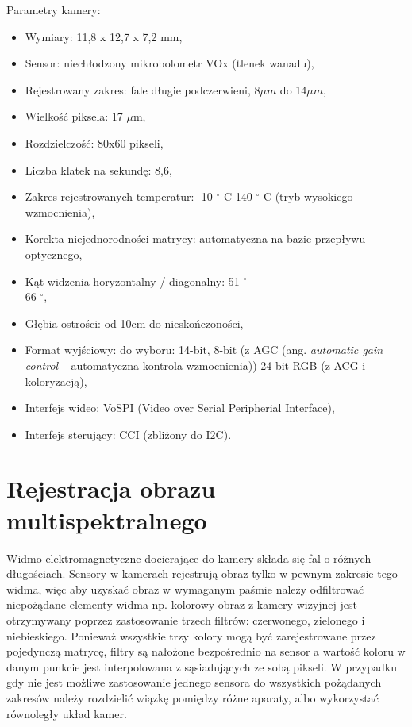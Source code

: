 Parametry kamery:
\begin{itemize}
\item Wymiary: 11,8 x 12,7 x 7,2 mm, 
\item Sensor: niechłodzony mikrobolometr VOx (tlenek wanadu),
\item Rejestrowany zakres: fale długie podczerwieni, 8$\mu m$ do 14$\mu m$,
\item Wielkość piksela: 17 $\mu$m,
\item Rozdzielczość: 80x60 pikseli,
\item Liczba klatek na sekundę: 8,6,  %
\item Zakres rejestrowanych temperatur: -10  $^\circ$  C 140  $^\circ$  C (tryb wysokiego wzmocnienia),
\item Korekta niejednorodności matrycy: automatyczna na bazie przepływu optycznego, %
\item Kąt widzenia horyzontalny / diagonalny: 51 $^\circ$ \\ 66 $^\circ$,
\item Głębia ostrości: od 10cm do nieskończoności,
\item Format wyjściowy: do wyboru: 14-bit, 8-bit (z AGC (ang. \textit{automatic gain control} -- automatyczna kontrola wzmocnienia)) 24-bit RGB (z ACG i koloryzacją),
\item Interfejs wideo: VoSPI (Video over Serial Peripherial Interface),
\item Interfejs sterujący: CCI (zbliżony do I2C).
\end{itemize}







\section{Rejestracja obrazu multispektralnego}

Widmo elektromagnetyczne docierające do kamery składa się fal o różnych długościach. Sensory w kamerach rejestrują obraz tylko w pewnym zakresie tego widma, więc aby uzyskać obraz w wymaganym paśmie należy odfiltrować niepożądane elementy widma np. kolorowy obraz z kamery wizyjnej jest otrzymywany poprzez zastosowanie trzech filtrów: czerwonego, zielonego i niebieskiego. Ponieważ wszystkie trzy kolory mogą być zarejestrowane przez pojedynczą matrycę, filtry są nałożone bezpośrednio na sensor a wartość koloru w danym punkcie jest interpolowana z sąsiadujących ze sobą pikseli. W przypadku gdy nie jest możliwe zastosowanie jednego sensora do wszystkich pożądanych zakresów należy rozdzielić wiązkę pomiędzy różne aparaty, albo wykorzystać równoległy układ kamer. 


